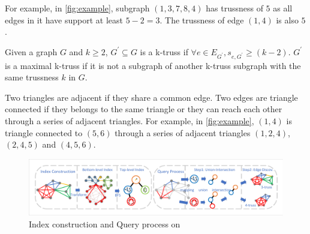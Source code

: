 For example, in \autoref{fig:example}, subgraph $(1,3,7,8,4)$ has trussness of $5$ as all edges in it have support at least $5-2=3$. The trussness of edge $(1,4)$ is also $5$.

\begin{Def}[k-truss]
Given a graph $G$ and $k \ge 2$, $G^{\prime} \subseteq G$ is a k-truss if $\forall e \in E_{G^{\prime}}, s_{e,G^{\prime}} \ge (k - 2)$. 
$G^{\prime}$ is a maximal k-truss if it is not a subgraph of another k-truss subgraph with the same trussness $k$ in $G$.
\label{def:k-truss}
\end{Def}


Two triangles are adjacent if they share a common edge. Two edges are triangle connected if they belongs to the same triangle or they can reach each other through a series of adjacent triangles. For example, in \autoref{fig:example}, $(1,4)$ is triangle connected to $(5,6)$ through a series of adjacent triangles $(1,2,4)$, $(2,4,5)$ and $(4,5,6)$.
%


\begin{figure}[ht]
    \centering
    \includegraphics[width=0.9\linewidth, trim={0.6cm 0.6cm, 0.6cm, 0.6cm}, clip]{./figures/flow.pdf}
		\vspace{-0.2cm}
    \caption{Index construction and Query process on \twolevelindex{}}
    \label{fig:flow}
		\vspace{-0.5cm}
\end{figure}

